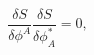 \begin{equation}
\frac{\delta S}{\delta \phi ^{A}}\frac{\delta S}{\delta \phi _{A}^{\ast }}=0,
\label{CME}
\end{equation}

